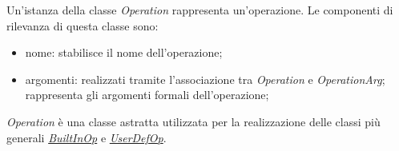 
Un'istanza della classe \textit{Operation} rappresenta un'operazione. Le componenti di rilevanza di questa classe sono:
\begin{itemize}
	\item nome: stabilisce il nome dell'operazione;
	\item argomenti: realizzati tramite l'associazione tra \textit{Operation} e \textit{OperationArg}; rappresenta gli argomenti formali dell'operazione;
\end{itemize}

\textit{Operation} è una classe astratta utilizzata per la realizzazione delle classi più generali \hyperref[sec:modelstranslator:analysis:model_analysis:operation:builtinop]{\textit{BuiltInOp}} e \hyperref[sec:modelstranslator:analysis:model_analysis:operation:userdefop]{\textit{UserDefOp}}.

